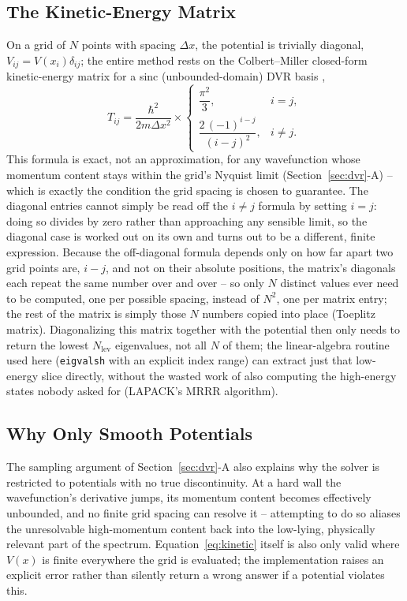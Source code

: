 \documentclass[10pt,conference]{IEEEtran}
\begin{document}
\subsection{The Kinetic-Energy Matrix}
\label{sec:kinetic}
On a grid of $N$ points with spacing $\Delta x$, the potential is trivially diagonal, $V_{ij}=V(x_i)\delta_{ij}$; the entire method rests on the Colbert--Miller closed-form kinetic-energy matrix for a sinc (unbounded-domain) DVR basis \cite{colbertmiller1992},
\begin{equation}
T_{ij} = \frac{\hbar^2}{2m\Delta x^2}\times
\begin{cases}
\dfrac{\pi^2}{3}, & i=j,\\[4pt]
\dfrac{2\,(-1)^{i-j}}{(i-j)^2}, & i\neq j.
\end{cases}
\label{eq:kinetic}
\end{equation}
This formula is exact, not an approximation, for any wavefunction whose momentum content stays within the grid's Nyquist limit (Section~\ref{sec:dvr}-A) -- which is exactly the condition the grid spacing is chosen to guarantee. The diagonal entries cannot simply be read off the $i\neq j$ formula by setting $i=j$: doing so divides by zero rather than approaching any sensible limit, so the diagonal case is worked out on its own and turns out to be a different, finite expression. Because the off-diagonal formula depends only on how far apart two grid points are, $i-j$, and not on their absolute positions, the matrix's diagonals each repeat the same number over and over -- so only $N$ distinct values ever need to be computed, one per possible spacing, instead of $N^2$, one per matrix entry; the rest of the matrix is simply those $N$ numbers copied into place (Toeplitz matrix). Diagonalizing this matrix together with the potential then only needs to return the lowest $N_{\text{lev}}$ eigenvalues, not all $N$ of them; the linear-algebra routine used here (\texttt{eigvalsh} with an explicit index range) can extract just that low-energy slice directly, without the wasted work of also computing the high-energy states nobody asked for (LAPACK's MRRR algorithm).

\subsection{Why Only Smooth Potentials}
The sampling argument of Section~\ref{sec:dvr}-A also explains why the solver is restricted to potentials with no true discontinuity. At a hard wall the wavefunction's derivative jumps, its momentum content becomes effectively unbounded, and no finite grid spacing can resolve it -- attempting to do so aliases the unresolvable high-momentum content back into the low-lying, physically relevant part of the spectrum. Equation~\eqref{eq:kinetic} itself is also only valid where $V(x)$ is finite everywhere the grid is evaluated; the implementation raises an explicit error rather than silently return a wrong answer if a potential violates this.
\end{document}
